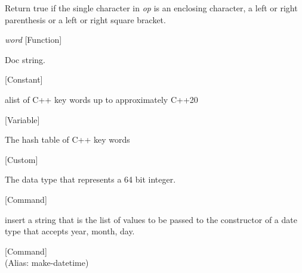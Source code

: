 \begin{doc-string}
Return true if the single character in \emph{op} is an enclosing character, a left
or right parenthesis or a left or right square bracket.
\end{doc-string}

\vspace{1em}
\noindent
{}
\usebox{\funcname}\emph{word}
 \hfill [Function]

\begin{doc-string}
Doc string.
\end{doc-string}

\vspace{1em}
\noindent
{}
\usebox{\funcname}
 \hfill [Constant]

\begin{doc-string}
alist of C++ key words up to approximately C++20
\end{doc-string}

\vspace{1em}
\noindent
{}
\usebox{\funcname}
 \hfill [Variable]

\begin{doc-string}
The hash table of C++ key words
\end{doc-string}

\vspace{1em}
\noindent
{}
\usebox{\funcname}
 \hfill [Custom]

\begin{doc-string}
The data type that represents a 64 bit integer.
\end{doc-string}

\vspace{1em}
\noindent
{}
\usebox{\funcname}
 \hfill [Command]

\begin{doc-string}
insert a string that is the list of values to be passed to the constructor of
 a date type that accepts year, month, day.
\end{doc-string}

\vspace{1em}
\noindent
{}
\usebox{\funcname}
 \hfill [Command]\\%
 (Alias: make-datetime)

